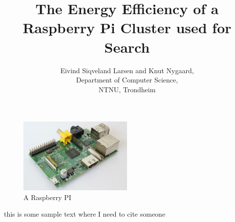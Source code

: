 \documentclass[a4paper, 12pt]{article}
\title{The Energy Efficiency of a Raspberry Pi Cluster used for Search}
\author{Eivind Siqveland Larsen and Knut Nygaard,\\
        Department of Computer Science,\\
        NTNU,
        Trondheim}
\begin{document}
\maketitle



\begin{figure}[h]
    \centering
    \includegraphics[width=0.5\textwidth]{hardware/RaspberryPi}
    \caption{A Raspberry PI}
    \label{fig:raspberrypi_hw}
\end{figure}

\clearpage
\tableofcontents


this is some sample text where I need to cite someone \cite{BEOwulf}









\clearpage


\end{document}
